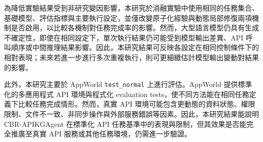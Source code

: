 \begin{ZhChapter}
為降低實驗結果受到非研究變因影響，本研究於消融實驗中使用相同的任務集合、基礎模型、評估指標與主要執行設定，並僅改變原子化經驗與動態局部修復兩項機制是否啟用，以比較各機制對任務完成率的影響。然而，大型語言模型仍具有生成不確定性，即使在相同設定下，單次執行結果仍可能受到模型輸出差異、API 呼叫順序或中間推理結果影響。因此，本研究結果可反映各設定在相同控制條件下的相對表現；未來若進一步進行多次重複執行，則可更細緻估計模型輸出變動對結果的影響。

此外，本研究主要於 AppWorld \texttt{test\_normal} 上進行評估。AppWorld 提供標準化的多應用程式 API 環境與程式化 evaluation tests，使不同方法能在相同任務定義下比較任務完成情形。然而，真實 API 環境可能包含更動態的資料狀態、權限限制、文件不一致、非同步操作與外部服務錯誤等因素。因此，本研究結果能說明 CBR-APIKGAgent 在標準化 API 任務基準中的表現與限制，但其效果是否能完全推廣至真實 API 服務或其他任務環境，仍需進一步驗證。

\end{ZhChapter}
